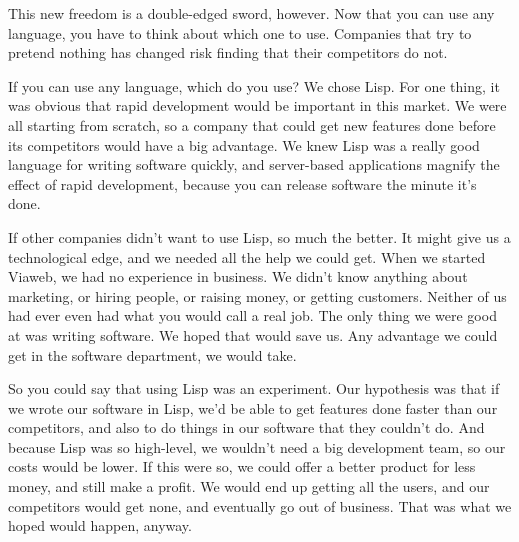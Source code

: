 This new freedom is a double-edged sword,
                  however. Now that you can use any language, you have to think
                  about which one to use. Companies that try to pretend nothing
                  has changed risk finding that their competitors do not.

If
                  you can use any language, which do you use? We chose Lisp. For
                  one thing, it was obvious that rapid development would be
                  important in this market. We were all starting from scratch,
                  so a company that could get new features done before its
                  competitors would have a big advantage. We knew Lisp was a
                  really good language for writing software quickly, and
                  server-based applications magnify the effect of rapid
                  development, because you can release software the minute it's
                  done.

If other companies didn't want to use Lisp,
                  so much the better. It might give us a technological edge, and
                  we needed all the help we could get. When we started Viaweb,
                  we had no experience in business. We didn't know anything
                  about marketing, or hiring people, or raising money, or
                  getting customers. Neither of us had ever even had what you
                  would call a real job. The only thing we were good at was
                  writing software. We hoped that would save us. Any advantage
                  we could get in the software department, we would take.

So
                  you could say that using Lisp was an experiment. Our
                  hypothesis was that if we wrote our software in Lisp, we'd be
                  able to get features done faster than our competitors, and
                  also to do things in our software that they couldn't do. And
                  because Lisp was so high-level, we wouldn't need a big
                  development team, so our costs would be lower. If this were
                  so, we could offer a better product for less money, and still
                  make a profit. We would end up getting all the users, and our
                  competitors would get none, and eventually go out of business.
                  That was what we hoped would happen, anyway.

